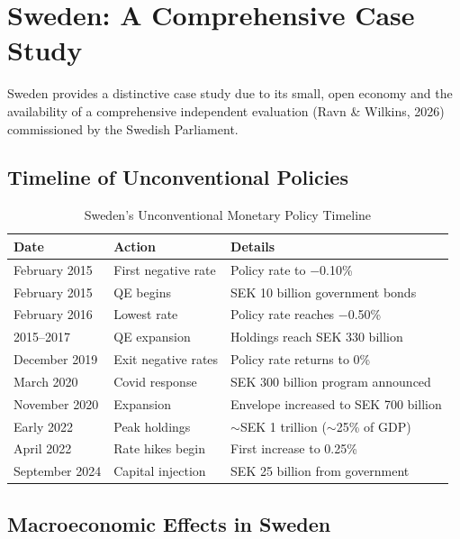 \documentclass[11pt,a4paper]{article}
\begin{document}
\section{Sweden: A Comprehensive Case Study}
\label{sec:sweden}

Sweden provides a distinctive case study due to its small, open economy and the availability of a comprehensive independent evaluation (Ravn \& Wilkins, 2026) commissioned by the Swedish Parliament.

\subsection{Timeline of Unconventional Policies}

\begin{table}[H]
\centering
\caption{Sweden's Unconventional Monetary Policy Timeline}
\label{tab:sweden_timeline}
\begin{tabular}{lll}
\toprule
\textbf{Date} & \textbf{Action} & \textbf{Details} \\
\midrule
February 2015 & First negative rate & Policy rate to $-$0.10\% \\
February 2015 & QE begins & SEK 10 billion government bonds \\
February 2016 & Lowest rate & Policy rate reaches $-$0.50\% \\
2015--2017 & QE expansion & Holdings reach SEK 330 billion \\
December 2019 & Exit negative rates & Policy rate returns to 0\% \\
March 2020 & Covid response & SEK 300 billion program announced \\
November 2020 & Expansion & Envelope increased to SEK 700 billion \\
Early 2022 & Peak holdings & $\sim$SEK 1 trillion ($\sim$25\% of GDP) \\
April 2022 & Rate hikes begin & First increase to 0.25\% \\
September 2024 & Capital injection & SEK 25 billion from government \\
\bottomrule
\end{tabular}
\end{table}

\subsection{Macroeconomic Effects in Sweden}
\end{document}
